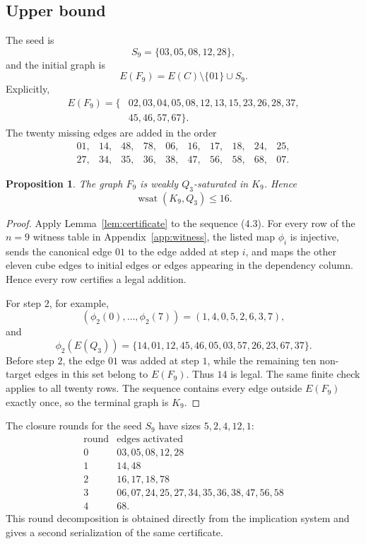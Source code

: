 \documentclass[11pt]{article}
\numberwithin{equation}{section}
\newtheorem{proposition}[theorem]{Proposition}
\newcommand{\wsat}{\operatorname{wsat}}
\begin{document}
\subsection{Upper bound}
The seed is
\[
S_9=\{03,05,08,12,28\},
\tag{4.1}
\]
and the initial graph is
\[
E(F_9)=E(C)\setminus\{01\}\cup S_9.
\tag{4.2}
\]
Explicitly,
\[
\begin{aligned}
E(F_9)=\{&02,03,04,05,08,12,13,15,23,26,28,37,\\
&45,46,57,67\}.
\end{aligned}
\]
The twenty missing edges are added in the order
\[
\begin{array}{llllllllll}
01,&14,&48,&78,&06,&16,&17,&18,&24,&25,\\
27,&34,&35,&36,&38,&47,&56,&58,&68,&07.
\end{array}
\tag{4.3}
\]

\begin{proposition}\label{prop:n9upper}
The graph $F_9$ is weakly $Q_3$-saturated in $K_9$. Hence
\[
\wsat(K_9,Q_3)\le16.
\]
\end{proposition}

\begin{proof}
Apply Lemma~\ref{lem:certificate} to the sequence (4.3). For every row of the $n=9$ witness table in Appendix~\ref{app:witness}, the listed map $\phi_i$ is injective, sends the canonical edge $01$ to the edge added at step $i$, and maps the other eleven cube edges to initial edges or edges appearing in the dependency column. Hence every row certifies a legal addition.

For step $2$, for example,
\[
(\phi_2(0),\ldots,\phi_2(7))=(1,4,0,5,2,6,3,7),
\]
and
\[
\phi_2(E(Q_3))=\{14,01,12,45,46,05,03,57,26,23,67,37\}.
\]
Before step $2$, the edge $01$ was added at step $1$, while the remaining ten non-target edges in this set belong to $E(F_9)$. Thus $14$ is legal. The same finite check applies to all twenty rows. The sequence contains every edge outside $E(F_9)$ exactly once, so the terminal graph is $K_9$.
\end{proof}

The closure rounds for the seed $S_9$ have sizes $5,2,4,12,1$:
\[
\begin{array}{c|l}
\text{round}&\text{edges activated}\\ \hline
0&03,05,08,12,28\\
1&14,48\\
2&16,17,18,78\\
3&06,07,24,25,27,34,35,36,38,47,56,58\\
4&68.
\end{array}
\tag{4.4}
\]
This round decomposition is obtained directly from the implication system and gives a second serialization of the same certificate.
\end{document}
